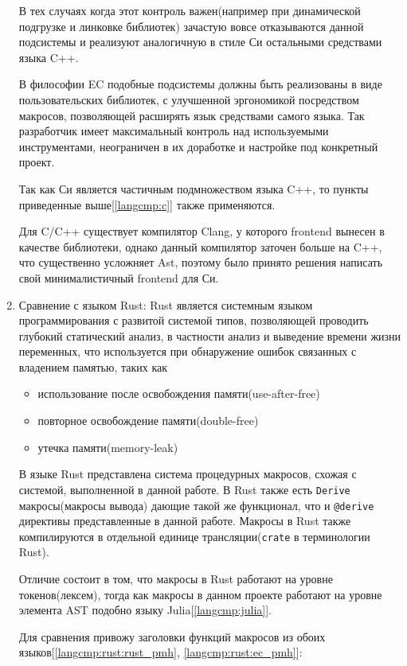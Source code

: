 \begin{enumerate}
В тех случаях когда этот контроль важен(например при динамической подгрузке и линковке библиотек) зачастую вовсе отказываются данной подсистемы и реализуют аналогичную в стиле Си остальными средствами языка C++.

В философии EC подобные подсистемы должны быть реализованы в виде пользовательских библиотек, с улучшенной эргономикой посредством макросов, позволяющей расширять язык средствами самого языка.
Так разработчик имеет максимальный контроль над используемыми инструментами, неограничен в их доработке и настройке под конкретный проект.

Так как Си является частичным подмножеством языка C++, то пункты приведенные выше[\ref{langcmp:c}] также применяются.

Для C/C++ существует компилятор Clang, у которого frontend вынесен в качестве библиотеки, однако данный компилятор заточен больше на C++, что существенно усложняет Ast, 
поэтому было принято решения написать свой минималистичный frontend для Си.



\item\label{langcmp:rust} Сравнение с языком Rust:\newline
Rust является системным языком программирования с развитой системой типов, позволяющей проводить глубокий статический анализ, в частности анализ и выведение времени жизни переменных, 
что используется при обнаружение ошибок связанных с владением памятью, таких как
\begin{itemize}
\item использование после освобождения памяти(use-after-free)
\item повторное освобождение памяти(double-free) 
\item утечка памяти(memory-leak)
\end{itemize}


В языке Rust представлена система\cite{rust-proc-macro} процедурных макросов, схожая с системой, выполненной в данной работе.
В Rust также есть \verb|Derive| макросы(макросы вывода) дающие такой же функционал, что и \verb|@derive| директивы представленные в данной работе.
Макросы в Rust также компилируются в отдельной единице трансляции(\verb|crate| в терминологии Rust).

Отличие состоит в том, что макросы в Rust работают на уровне токенов(лексем), тогда как макросы в данном проекте работают на уровне элемента AST подобно языку Julia[\ref{langcmp:julia}].

Для сравнения привожу заголовки функций макросов из обоих языков[\ref{langcmp:rust:rust_pmh}, \ref{langcmp:rust:ec_pmh}]:



\end{enumerate}
